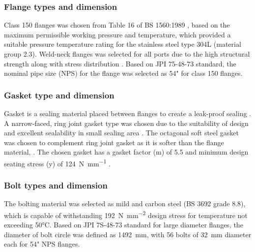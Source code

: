 

\subsubsection{Flange types and dimension}
Class 150 flanges was chosen from Table 16 of BS 1560:1989 \cite{noauthor_circular_nodate}, based on the maximum permissible working pressure and temperature, which provided a suitable pressure temperature rating for the stainless steel type 304L (material group 2.3). Weld-neck flanges was selected for all ports due to the high structural strength along with stress distribution \cite{ulma_forge_welding_2020}.
Based on JPI 75-48-73 standard, the nominal pipe size (NPS) for the flange was selected as 54" for class 150 flanges.

\subsubsection{Gasket type and dimension}
Gasket is a sealing material placed between flanges to create a leak-proof sealing \cite{varun_piping_nodate}. A narrow-faced, ring joint gasket type was chosen due to the suitability of design and excellent sealability in small sealing area \cite{noauthor_ring_nodate}. The octagonal soft steel gasket was chosen to complement ring joint gasket as it is softer than the flange material, . The chosen gasket has a gasket factor (m) of 5.5 and minimum design seating stress (y) of \SI{124}{\N\per\mm} \cite{noauthor_unfired_nodate}.

\subsubsection{Bolt types and dimension}
The bolting material was selected as mild and carbon steel (BS 3692 grade 8.8), which is capable of withstanding \SI{192}{\N\per\square\mm} design stress for temperature not exceeding 50°C. Based on JPI 7S-48-73 standard for large diameter flanges, the diameter of bolt circle was defined as \SI{1492}{\milli \metre}, with 56 bolts of \SI{32}{\milli \metre} diameter each for 54" NPS flanges. 

